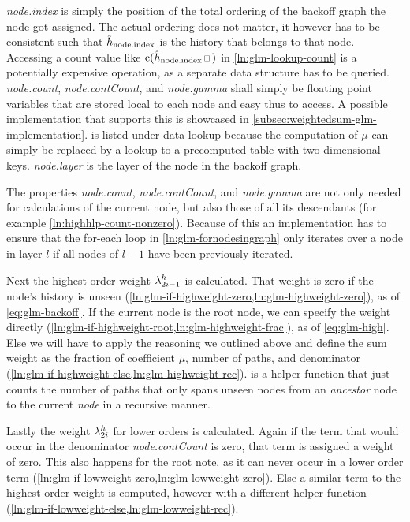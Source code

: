 \emph{node.index} is simply the position of the total ordering of the backoff
graph the node got assigned.
The actual ordering does not matter, it however has to be consistent such that
$\DerivedHistory[\text{node.index}]$ is the history that belongs to that node.
Accessing a count value like $\Count(\DerivedHistory[\text{node.index}] \Skp)$
in \cref{ln:glm-lookup-count} is a potentially expensive operation, as a
separate data structure has to be queried.
\emph{node.count}, \emph{node.contCount}, and \emph{node.gamma} shall simply be
floating point variables that are stored local to each node and easy thus to
access.
A possible implementation that supports this is showcased in
\cref{subsec:weightedsum-glm-implementation}.
 is listed under data lookup because the computation
of $\mu$ can simply be replaced by a lookup to a precomputed table with
two-dimensional keys. \emph{node.layer} is the layer of the node in the
backoff graph.

The properties \emph{node.count}, \emph{node.contCount}, and
\emph{node.gamma} are not only needed for calculations of the current node, but
also those of all its descendants (for example \cref{ln:highhlp-count-nonzero}).
Because of this an implementation has to ensure that the for-each loop in
\cref{ln:glm-fornodesingraph} only iterates over a node in layer $l$ if all
nodes of $l-1$ have been previously iterated.

Next the highest order weight $\lambda^h_{2 i - 1}$ is calculated.
That weight is zero if the node's history is unseen
(\cref{ln:glm-if-highweight-zero,ln:glm-highweight-zero}), as of
\cref{eq:glm-backoff}.
If the current node is the root node, we can specify the weight directly
(\cref{ln:glm-if-highweight-root,ln:glm-highweight-frac}), as of
\cref{eq:glm-high}.
Else we will have to apply the reasoning we outlined above and define the sum
weight as the fraction of coefficient $\mu$, number of paths, and denominator
(\cref{ln:glm-if-highweight-else,ln:glm-highweight-rec}).
 is a helper function
that just counts the number of paths that only spans unseen nodes from
an \emph{ancestor} node to the current \emph{node} in a recursive manner.

Lastly the weight $\lambda^h_{2 i}$ for lower orders is calculated.
Again if the term that would occur in the denominator \emph{node.contCount} is
zero, that term is assigned a weight of zero.
This also happens for the root note, as it can never occur in a lower order term
(\cref{ln:glm-if-lowweight-zero,ln:glm-lowweight-zero}).
Else a similar term to the highest order weight is computed, however with a
different helper function
(\cref{ln:glm-if-lowweight-else,ln:glm-lowweight-rec}).

